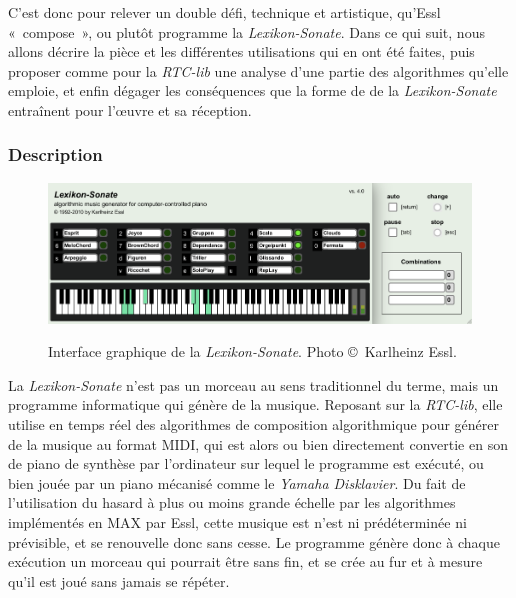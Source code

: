 \documentclass[a4paper,12pt]{article}
\newcommand{\guill}[1]{«~#1~»}
\begin{document}
C'est donc pour relever un double défi, technique et artistique, qu'Essl \guill{compose}, ou plutôt programme la \emph{Lexikon-Sonate}. Dans ce qui suit, nous allons décrire la pièce et les différentes utilisations qui en ont été faites, puis proposer comme pour la \emph{RTC-lib} une analyse d'une partie des algorithmes qu'elle emploie, et enfin dégager les conséquences que la forme de de la \emph{Lexikon-Sonate} entraînent pour l'œuvre et sa réception.

\subsubsection{Description}

\begin{figure}[h!]
\begin{center}
\includegraphics[width=\textwidth]{images/lexson.png}
\label{lsinterface}
\caption{\footnotesize Interface graphique de la \emph{Lexikon-Sonate}. Photo \copyright~Karlheinz Essl.} %
\end{center}
\end{figure}

La \emph{Lexikon-Sonate} n'est pas un morceau au sens traditionnel du terme, mais un programme informatique qui génère de la musique. Reposant sur la \emph{RTC-lib}, elle utilise en temps réel des algorithmes de composition algorithmique pour générer de la musique au format MIDI, qui est alors ou bien directement convertie en son de piano de synthèse par l'ordinateur sur lequel le programme est exécuté, ou bien jouée par un piano mécanisé comme le \emph{Yamaha Disklavier}. Du fait de l'utilisation du hasard à plus ou moins grande échelle par les algorithmes implémentés en MAX par Essl, cette musique est n'est ni prédéterminée ni prévisible, et se renouvelle donc sans cesse. Le programme génère donc à chaque exécution un morceau qui pourrait être sans fin, et se crée au fur et à mesure qu'il est joué sans jamais se répéter.
\end{document}
